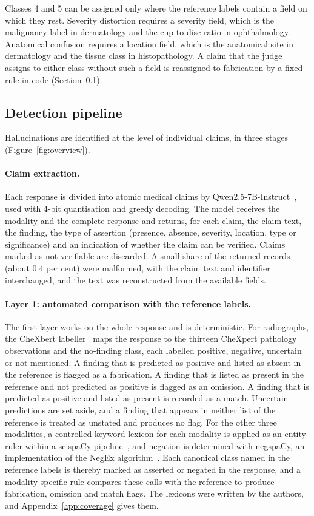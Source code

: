 Classes 4 and 5 can be assigned only where the reference labels contain a field on which they rest. Severity distortion requires a severity field, which is the malignancy label in dermatology and the cup-to-disc ratio in ophthalmology. Anatomical confusion requires a location field, which is the anatomical site in dermatology and the tissue class in histopathology. A claim that the judge assigns to either class without such a field is reassigned to fabrication by a fixed rule in code (Section~\ref{sec:pipeline}).

\subsection{Detection pipeline}\label{sec:pipeline}
Hallucinations are identified at the level of individual claims, in three stages (Figure~\ref{fig:overview}).

\paragraph{Claim extraction.} Each response is divided into atomic medical claims by Qwen2.5-7B-Instruct~\citep{qwen2024qwen25}, used with 4-bit quantisation and greedy decoding. The model receives the modality and the complete response and returns, for each claim, the claim text, the finding, the type of assertion (presence, absence, severity, location, type or significance) and an indication of whether the claim can be verified. Claims marked as not verifiable are discarded. A small share of the returned records (about 0.4 per cent) were malformed, with the claim text and identifier interchanged, and the text was reconstructed from the available fields.

\paragraph{Layer 1: automated comparison with the reference labels.} The first layer works on the whole response and is deterministic. For radiographs, the CheXbert labeller~\citep{smit2020chexbert} maps the response to the thirteen CheXpert pathology observations and the no-finding class, each labelled positive, negative, uncertain or not mentioned. A finding that is predicted as positive and listed as absent in the reference is flagged as a fabrication. A finding that is listed as present in the reference and not predicted as positive is flagged as an omission. A finding that is predicted as positive and listed as present is recorded as a match. Uncertain predictions are set aside, and a finding that appears in neither list of the reference is treated as unstated and produces no flag. For the other three modalities, a controlled keyword lexicon for each modality is applied as an entity ruler within a scispaCy pipeline~\citep{neumann2019scispacy}, and negation is determined with negspaCy, an implementation of the NegEx algorithm~\citep{chapman2001negex}. Each canonical class named in the reference labels is thereby marked as asserted or negated in the response, and a modality-specific rule compares these calls with the reference to produce fabrication, omission and match flags. The lexicons were written by the authors, and Appendix~\ref{app:coverage} gives them.

